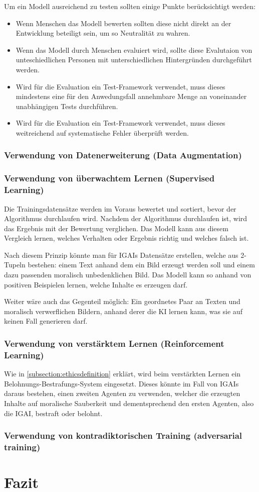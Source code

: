 \documentclass[12pt]{article}
\begin{document}
Um ein Modell ausreichend zu testen sollten einige Punkte berücksichtigt werden:
\begin{itemize}
    \item Wenn Menschen das Modell bewerten sollten diese nicht direkt an der Entwicklung beteiligt sein, um so Neutralität zu wahren.
    \item Wenn das Modell durch Menschen evaluiert wird, sollte diese Evalutaion von unteschiedlichen Personen mit unterschiedlichen Hintergründen durchgeführt werden.
    \item Wird für die Evaluation ein Test-Framework verwendet, muss dieses mindestens eine für den Anwedungsfall annehmbare Menge an voneinander unabhängigen Tests durchführen.
    \item Wird für die Evaluation ein Test-Framework verwendet, muss dieses weitreichend auf systematische Fehler überprüft werden.
\end{itemize}

\subsubsection{Verwendung von Datenerweiterung (Data Augmentation)}

\subsubsection{Verwendung von überwachtem Lernen (Supervised Learning)}
Die Trainingsdatensätze werden im Voraus bewertet und sortiert, bevor der Algorithmus durchlaufen wird. Nachdem der Algorithmus durchlaufen ist, wird das Ergebnis mit der Bewertung verglichen. 
Das Modell kann aus diesem Vergleich lernen, welches Verhalten oder Ergebnis richtig und welches falsch ist.

Nach diesem Prinzip könnte man für IGAIs Datensätze erstellen, welche aus 2-Tupeln bestehen: einem Text anhand dem ein Bild erzeugt werden soll und einem dazu passenden moralisch unbedenklichen Bild. 
Das Modell kann so anhand von positiven Beispielen lernen, welche Inhalte es erzeugen darf.

Weiter wäre auch das Gegenteil möglich: Ein geordnetes Paar an Texten und moralisch verwerflichen Bildern, anhand derer die KI lernen kann, was sie auf keinen Fall generieren darf.

\subsubsection{Verwendung von verstärktem Lernen (Reinforcement Learning)}
Wie in \ref{subsection:ethicsdefinition} erklärt, wird beim verstärkten Lernen ein Belohnungs-Bestrafungs-System eingesetzt. Dieses könnte im Fall von IGAIs daraus bestehen, einen zweiten Agenten zu verwenden, welcher die erzeugten Inhalte auf moralische Sauberkeit und dementsprechend den ersten Agenten, also die IGAI, bestraft oder belohnt.

\subsubsection{Verwendung von kontradiktorischen Training (adversarial training)}



\section{Fazit}


\end{document}
